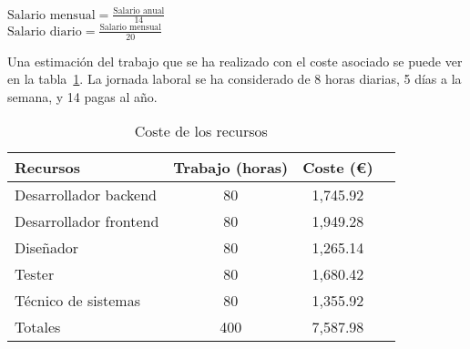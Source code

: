 \begin{center}
	$\text{Salario mensual} = \frac{\text{Salario anual}}{14}$\\
	$\text{Salario diario} = \frac{\text{Salario mensual}}{20}$
\end{center}

Una estimación del trabajo que se ha realizado con el coste asociado se puede ver en la tabla~\ref{tab:coste_recursos}.
La jornada laboral se ha considerado de 8 horas diarias, 5 días a la semana, y 14 pagas al año.

\begin{table}[H]
	\centering
	\begin{tabular}{lccc}
		\toprule
		\textbf{Recursos}    & \textbf{Trabajo (horas)} & \textbf{Coste (\euro)} \\
		\midrule
		Desarrollador backend  & 80                       & 1,745.92         \\
		Desarrollador frontend & 80                       & 1,949.28         \\
		Diseñador              & 80                       & 1,265.14         \\
		Tester                 & 80                       & 1,680.42         \\
		Técnico de sistemas    & 80                       & 1,355.92         \\
		\bottomrule
		Totales                & 400                      & 7,587.98         \\
	\end{tabular}
	\caption{Coste de los recursos}
	\label{tab:coste_recursos}
\end{table}
